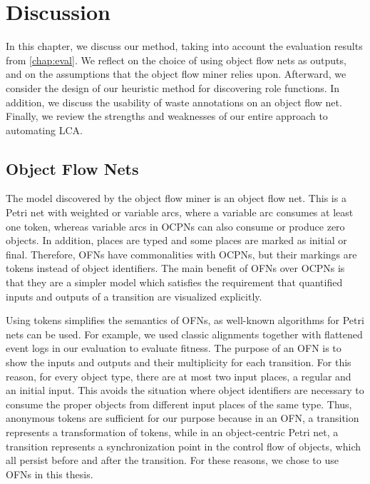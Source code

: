 \chapter{Discussion}
\label{chap:discussion}

In this chapter, we discuss our method, taking into account the evaluation results from \cref{chap:eval}.
We reflect on the choice of using object flow nets as outputs, and on the assumptions that the object flow miner relies upon.
Afterward, we consider the design of our heuristic method for discovering role functions.
In addition, we discuss the usability of waste annotations on an object flow net.
Finally, we review the strengths and weaknesses of our entire approach to automating LCA.



\section{Object Flow Nets}




The model discovered by the object flow miner is an object flow net.
This is a Petri net with weighted or variable arcs, where a variable arc consumes at least one token, whereas variable arcs in OCPNs can also consume or produce zero objects.
In addition, places are typed and some places are marked as initial or final.
Therefore, OFNs have commonalities with OCPNs, but their markings are tokens instead of object identifiers.
The main benefit of OFNs over OCPNs is that they are a simpler model which satisfies the requirement that quantified inputs and outputs of a transition are visualized explicitly.



Using tokens simplifies the semantics of OFNs, as well-known algorithms for Petri nets can be used.
For example, we used classic alignments together with flattened event logs in our evaluation to evaluate fitness.
The purpose of an OFN is to show the inputs and outputs and their multiplicity for each transition.
For this reason, for every object type, there are at most two input places, a regular and an initial input.
This avoids the situation where object identifiers are necessary to consume the proper objects from different input places of the same type.
Thus, anonymous tokens are sufficient for our purpose because in an OFN, a transition represents a transformation of tokens, while in an object-centric Petri net, a transition represents a synchronization point in the control flow of objects, which all persist before and after the transition.
For these reasons, we chose to use OFNs in this thesis.





